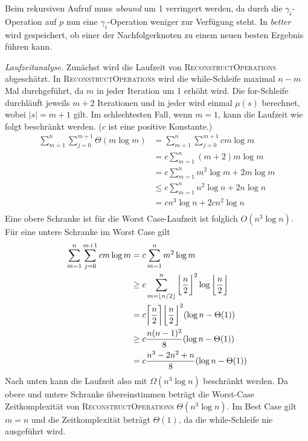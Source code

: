 \documentclass[a4paper, 11pt, ngerman]{article}
\begin{document}
\noindent Beim rekursiven Aufruf muss \emph{ubound} um 1 verringert werden, da durch die $\gamma_i$-Operation auf $p$ nun eine $\gamma_i$-Operation weniger zur Verfügung steht. In \emph{better} wird gespeichert, ob einer der Nachfolgerknoten zu einem neuen besten Ergebnis führen kann.
\bigskip

\noindent \emph{Laufzeitanalyse.} Zunächst wird die Laufzeit von \textsc{ReconstructOperations} abgeschätzt. In \textsc{ReconstructOperations} wird die while-Schleife maximal $n - m$ Mal durchgeführt, da $m$ in jeder Iteration um 1 erhöht wird. Die for-Schleife durchläuft jeweils $m + 2$ Iterationen und in jeder wird einmal $\mu(s)$ berechnet, wobei $|s| = m+1$ gilt. Im schlechtesten Fall, wenn $m = 1$, kann die Laufzeit wie folgt beschränkt werden. ($c$ ist eine positive Konstante.)
\begin{align*}
    \sum_{m = 1}^n \sum_{j = 0}^{m+1} \Theta(m \log m)
     & = \sum_{m = 1}^n \sum_{j = 0}^{m+1} cm \log m \\
     & = c \sum_{m = 1}^n (m + 2)m \log m            \\
     & = c \sum_{m = 1}^n m^2 \log m + 2 m \log m    \\
     & \le c \sum_{m = 1}^n n^2 \log n  + 2 n \log n \\
     & = cn^3 \log n + 2cn^2 \log n                  \\
\end{align*}
Eine obere Schranke ist für die Worst Case-Laufzeit ist folglich $O(n^3 \log n)$. Für eine untere Schranke im Worst Case gilt
\begin{align*}
    \sum_{m = 1}^n \sum_{j = 0}^{m+1} cm \log m
     & = c \sum_{m = 1}^n m^2 \log m                                                                                                          \\
     & \ge c \sum_{m = \lfloor n / 2 \rfloor}^{n} \bigg{\lfloor} \frac {n} {2} \bigg{\rfloor} ^2 \log \bigg{\lfloor} \frac n 2 \bigg{\rfloor} \\
     & = c \bigg{\lceil} \frac n 2 \bigg{\rceil} \bigg{\lfloor} \frac n 2 \bigg{\rfloor} ^2 (\log n - \Theta (1))                             \\
     & \ge c \frac {n(n - 1)^2}  8 (\log n - \Theta (1))                                                                                      \\
     & = c \frac {n^3 - 2n^2 + n} 8 (\log n - \Theta (1))
\end{align*}
Nach unten kann die Laufzeit also mit $\Omega(n^3 \log n)$ beschränkt werden. Da obere und untere Schranke übereinstimmen beträgt die Worst-Case Zeitkomplexität von \textsc{ReconstructOperations} $\Theta(n^3 \log n)$. Im Best Case gilt $m = n$ und die Zeitkomplexität beträgt $\Theta(1)$, da die while-Schleife nie ausgeführt wird.
\end{document}
